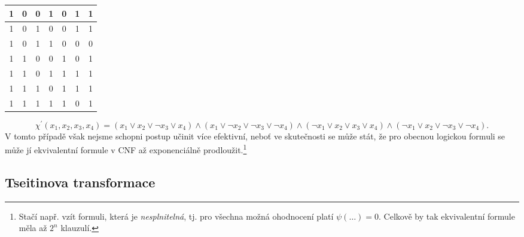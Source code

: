 \begin{example}
\begin{table}[h]
\begin{tabular}{|c|c|c|c|c|c|c|}
        1     & 0     & 0     & 1     & 0             & 1                                                 & 1                                    \\ \hline
        1     & 0     & 1     & 0     & 0             & 1                                                 & 1                                    \\ \hline
        1     & 0     & 1     & 1     & 0             & 0                                                 & 0                                    \\ \hline
        1     & 1     & 0     & 0     & 1             & 0                                                 & 1                                    \\ \hline
        1     & 1     & 0     & 1     & 1             & 1                                                 & 1                                    \\ \hline
        1     & 1     & 1     & 0     & 1             & 1                                                 & 1                                    \\ \hline
        1     & 1     & 1     & 1     & 1             & 0                                                 & 1                                    \\ \hline
        \end{tabular}
    \end{table}
    \[\chi^\prime(x_1,x_2,x_3,x_4)=(x_1\lor x_2\lor \neg x_3\lor x_4)\land(x_1\lor\neg x_2\lor\neg x_3\lor\neg x_4)\land(\neg x_1\lor x_2\lor x_3\lor x_4)\land(\neg x_1\lor x_2\lor \neg x_3\lor\neg x_4).\]
    V tomto případě však nejsme schopni postup učinit více efektivní, neboť ve skutečnosti se může stát, že pro obecnou logickou formuli se může jí ekvivalentní formule v CNF až exponenciálně prodloužit.\footnote{Stačí např. vzít formuli, která je \emph{nesplnitelná}, tj. pro všechna možná ohodnocení platí $\psi(\dots)=0$. Celkově by tak ekvivalentní formule měla až $2^n$ klauzulí.}
\end{example}

\subsection{Tseitinova transformace}\label{subsec:cnf_tseitin}

